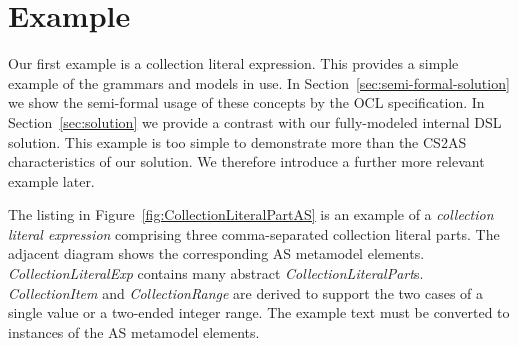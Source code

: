 \documentclass{llncs}
\begin{document}
\section{Example}
\label{sec:example}

Our first example is a collection literal expression. This provides a simple example of the grammars and models in use. In Section~\ref{sec:semi-formal-solution} we show the semi-formal usage of these concepts by the OCL specification. In Section~\ref{sec:solution} we provide a contrast with our fully-modeled internal DSL solution. This example is too simple to demonstrate more than the CS2AS characteristics of our solution. We therefore introduce a further more relevant example later.







The listing in Figure~\ref{fig:CollectionLiteralPartAS} is an example of a \textit{collection literal expression} comprising three comma-separated collection literal parts. The adjacent diagram shows the corresponding AS metamodel elements. \emph{CollectionLiteralExp} contains many abstract \emph{CollectionLiteralPart}s. \emph{CollectionItem} and \emph{CollectionRange} are derived to support the two cases of a single value or a two-ended integer range. The example text must be converted to instances of the AS metamodel elements.
\end{document}
